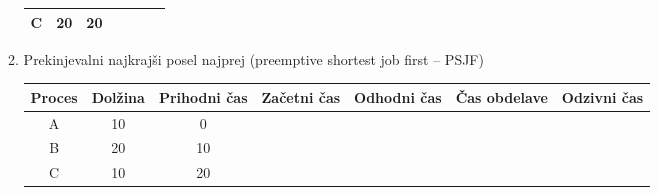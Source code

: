 \documentclass{book}
\begin{document}
\begin{enumerate}
\begin{enumerate}
\begin{tabular}{|c|c|c|c|c|c|c|}
                    \hline
                    C & 20 & 20 & & & & \\
                    \hline
                \end{tabular}            
            \item Prekinjevalni najkrajši posel najprej (preemptive shortest job first – PSJF) \\
                \begin{tabular}{|c|c|c|c|c|c|c|}
                    \hline
                    Proces & Dolžina & Prihodni čas & Začetni čas & Odhodni čas & Čas obdelave & Odzivni čas \\
                    \hline
                    A & 10 & 0 & & & & \\
                    \hline
                    B & 20 & 10 & & & & \\
                    \hline
                    C & 10 & 20 & & & & \\
                    \hline
                \end{tabular}
        \end{enumerate}
\end{enumerate}
\end{document}
